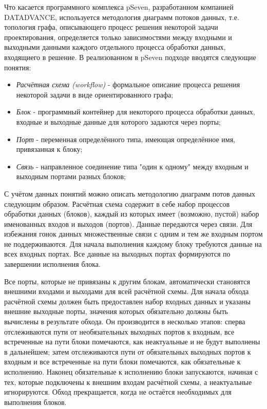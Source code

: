 Что касается программного комплекса pSeven, разработанном компанией DATADVANCE, используется методология диаграмм потоков данных, т.е. топология графа, описывающего процесс решения некоторой задачи проектирования, определяется только зависимостями между входными и выходными данными каждого отдельного процесса обработки данных, входящиего в решение. \cite{Nazarenko2015} В реализованном в pSeven подходе вводятся следующие понятия:
\begin{itemize}
    \item \emph{Расчётная схема (workflow)} - формальное описание процесса решения некоторой задачи в виде ориентированного графа;
    \item \emph{Блок} - программный контейнер для некоторого процесса обработки данных, входные и выходные данные для которого задаются через порты;
    \item \emph{Порт} - переменная определённого типа, имеющая определённое имя, привязанная к блоку;
    \item \emph{Связь} - направленное соединение типа "один к одному" между входным и выходным портами разных блоков;
\end{itemize}

С учётом данных понятий можно описать методологию диаграмм потов данных следующим образом. Расчётная схема содержит в себе набор процессов обработки данных (блоков), каждый из которых имеет (возможно, пустой) набор именованных входов и выходов (портов). Данные передаются через связи. Для избежания гонок данных множественные связи с одним и тем же входным портом не поддерживаются. Для начала выполнения каждому блоку требуются данные на всех входных портах. Все данные на выходных портах формируются по завершении исполнения блока.\cite{Nazarenko2015}

Все порты, которые не привязаны к другим блокам, автоматически становятся внешними входами и выходами для всей расчётной схемы. Для начала обхода расчётной схемы должен быть предоставлен набор входных данных и указаны внешние выходные порты, значения которых обязательно должны быть вычислены в результате обхода. Он производится в несколько этапов: сперва отслеживаются пути от необязательных выходных портов к входным, все встреченные на пути блоки помечаются, как неактуальные и не будут выполнены в дальнейшем; затем отслеживаются пути от обязательных выходных портов к входным и все встреченные на пути блоки помечаются, как обязательные к исполнению. Наконец обязательные к исполнению блоки запускаются, начиная с тех, которые подключены к внешним входам расчётной схемы, а неактуальные игнорируются. Обход прекращается, когда не остаётся необходимых для выполнения блоков. \cite{Nazarenko2015}

